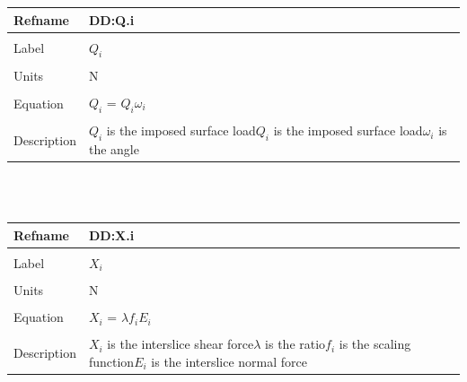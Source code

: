 \documentclass[12pt]{article}
\begin{document}
\noindent \begin{minipage}{\textwidth}
\begin{tabular}{p{} p{}}
\toprule \textbf{Refname} & \textbf{DD:Q.i}
\label{DD:Q.i}
\\ \midrule \\
Label & $Q_{i}$
\\ \midrule \\
Units & N
\\ \midrule \\
Equation & $Q_{i}$ = $Q_{i}\omega{}_{i}$
\\ \midrule \\
Description & $Q_{i}$ is the imposed surface load\newline$Q_{i}$ is the imposed surface load\newline$\omega{}_{i}$ is the angle
\\ \bottomrule \end{tabular}
\end{minipage}\\
~\newline
\noindent \begin{minipage}{\textwidth}
\begin{tabular}{p{} p{}}
\toprule \textbf{Refname} & \textbf{DD:X.i}
\label{DD:X.i}
\\ \midrule \\
Label & $X_{i}$
\\ \midrule \\
Units & N
\\ \midrule \\
Equation & $X_{i}$ = $\lambda{}f_{i}E_{i}$
\\ \midrule \\
Description & $X_{i}$ is the interslice shear force\newline$\lambda{}$ is the ratio\newline$f_{i}$ is the scaling function\newline$E_{i}$ is the interslice normal force
\\ \bottomrule \end{tabular}
\end{minipage}\\
~\newline
\end{document}
